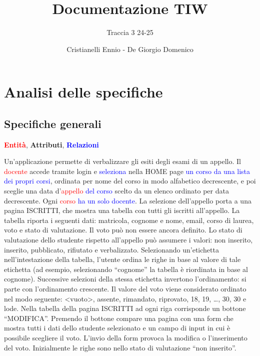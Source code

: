 \documentclass[a4paper,12pt]{scrreprt}
\title{Documentazione TIW}
\subtitle{Traccia 3 24-25}
\author{Cristianelli Ennio - De Giorgio Domenico}
\date{}
\begin{document}
\maketitle

\tableofcontents

\chapter{Analisi delle specifiche}
\section{Specifiche generali}
\begin{center}
  \textcolor{red}{\textbf{Entità}},
  \textcolor{green!60!black}{\textbf{Attributi}},
  \textcolor{blue}{\textbf{Relazioni}}
\end{center}
\noindent Un’applicazione permette di verbalizzare gli esiti degli esami di un appello. Il \textcolor{red}{docente} accede tramite login e
\textcolor{blue}{seleziona} nella HOME page \textcolor{blue}{un corso da una lista dei propri corsi}, ordinata per nome del corso in modo alfabetico
decrescente, e poi sceglie una \textcolor{green!60!black}{data} d’\textcolor{red}{appello} \textcolor{blue}{del corso} scelto da un elenco ordinato per data decrescente. Ogni
\textcolor{red}{corso} \textcolor{blue}{ha un solo docente}. La selezione dell’appello porta a una pagina ISCRITTI, che mostra una tabella con tutti gli
iscritti all’appello. La tabella riporta i seguenti dati: \textcolor{green!60!black}{matricola, cognome e nome, email, corso di laurea, voto e stato
di valutazione}. Il voto può non essere ancora definito. Lo stato di valutazione dello studente rispetto all’appello può
assumere i valori: non inserito, inserito, pubblicato, rifiutato e verbalizzato. Selezionando un’etichetta
nell’intestazione della tabella, l’utente ordina le righe in base al valore di tale etichetta (ad esempio, selezionando
“cognome” la tabella è riordinata in base al cognome). Successive selezioni della stessa etichetta invertono
l’ordinamento: si parte con l’ordinamento crescente. Il valore del voto viene considerato ordinato nel modo
seguente: <vuoto>, assente, rimandato, riprovato, 18, 19, …, 30, 30 e lode. Nella tabella della pagina ISCRITTI ad
ogni riga corrisponde un bottone “MODIFICA”. Premendo il bottone compare una pagina con una form che mostra
tutti i dati dello studente selezionato e un campo di input in cui è possibile scegliere il voto. L’invio della form
provoca la modifica o l’inserimento del voto. Inizialmente le righe sono nello stato di valutazione “non inserito”.
\end{document}

